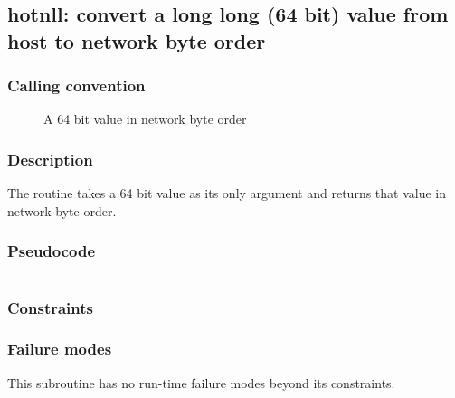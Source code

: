 \clearpage
{}
{}
\label{subr:htonll}
\subsection*{hotnll: convert a long long (64 bit) value from host to  network byte order}

\subsubsection*{Calling convention}

\begin{description}
\item[] A 64 bit value in network byte order
\end{description}

\subsubsection*{Description}

The  routine takes a 64 bit value as its only
argument and returns that value in network byte order.

\subsubsection*{Pseudocode}

\begin{verbatim}
\end{verbatim}

\subsubsection*{Constraints}

\subsubsection*{Failure modes}

This subroutine has no run-time failure modes beyond its constraints.
